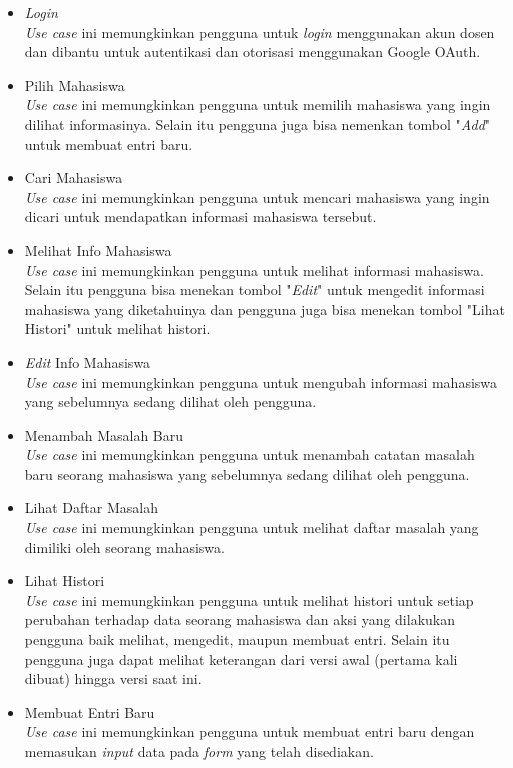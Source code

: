 \begin{itemize}
\item {\it Login}\\
{\it Use case} ini memungkinkan pengguna untuk {\it login} menggunakan akun dosen dan dibantu untuk autentikasi dan otorisasi menggunakan Google OAuth.
\item Pilih Mahasiswa\\
{\it Use case} ini memungkinkan pengguna untuk memilih mahasiswa yang ingin dilihat informasinya. Selain itu pengguna juga bisa nemenkan tombol "{\it Add}" untuk membuat entri baru.
\item Cari Mahasiswa\\
{\it Use case} ini memungkinkan pengguna untuk mencari mahasiswa yang ingin dicari untuk mendapatkan informasi mahasiswa tersebut.
\item Melihat Info Mahasiswa\\
{\it Use case} ini memungkinkan pengguna untuk melihat informasi mahasiswa. Selain itu pengguna bisa menekan tombol "{\it Edit}" untuk mengedit informasi mahasiswa yang diketahuinya dan pengguna juga bisa menekan tombol "Lihat Histori" untuk melihat histori.
\item {\it Edit} Info Mahasiswa\\
{\it Use case} ini memungkinkan pengguna untuk mengubah informasi mahasiswa yang sebelumnya sedang dilihat oleh pengguna.
\item Menambah Masalah Baru\\
{\it Use case} ini memungkinkan pengguna untuk menambah catatan masalah baru seorang mahasiswa yang sebelumnya sedang dilihat oleh pengguna.
\item Lihat Daftar Masalah\\
{\it Use case} ini memungkinkan pengguna untuk melihat daftar masalah yang dimiliki oleh seorang mahasiswa.
\item Lihat Histori\\
{\it Use case} ini memungkinkan pengguna untuk melihat histori untuk setiap perubahan terhadap data seorang mahasiswa dan aksi yang dilakukan pengguna baik melihat, mengedit, maupun membuat entri. Selain itu pengguna juga dapat melihat keterangan dari versi awal (pertama kali dibuat) hingga versi saat ini.
\item Membuat Entri Baru\\
{\it Use case} ini memungkinkan pengguna untuk membuat entri baru dengan memasukan {\it input} data pada {\it form} yang telah disediakan.
\end{itemize}

